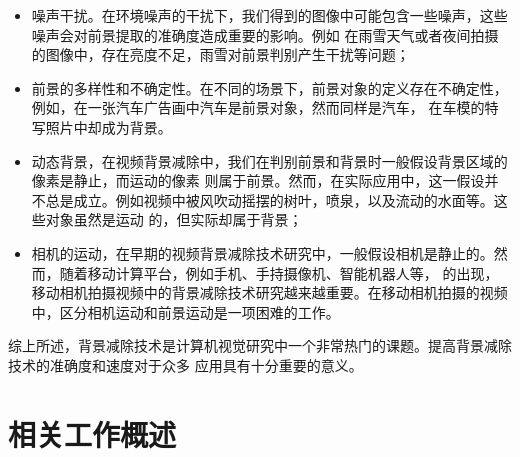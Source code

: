  \begin{itemize}
    \item 噪声干扰。在环境噪声的干扰下，我们得到的图像中可能包含一些噪声，这些噪声会对前景提取的准确度造成重要的影响。例如
    在雨雪天气或者夜间拍摄的图像中，存在亮度不足，雨雪对前景判别产生干扰等问题；
    \item 前景的多样性和不确定性。在不同的场景下，前景对象的定义存在不确定性，例如，在一张汽车广告画中汽车是前景对象，然而同样是汽车，
    在车模的特写照片中却成为背景。
    \item 动态背景，在视频背景减除中，我们在判别前景和背景时一般假设背景区域的像素是静止，而运动的像素
    则属于前景。然而，在实际应用中，这一假设并不总是成立。例如视频中被风吹动摇摆的树叶，喷泉，以及流动的水面等。这些对象虽然是运动
    的，但实际却属于背景；
    \item 相机的运动，在早期的视频背景减除技术研究中，一般假设相机是静止的。然而，随着移动计算平台，例如手机、手持摄像机、智能机器人等，
    的出现，移动相机拍摄视频中的背景减除技术研究越来越重要。在移动相机拍摄的视频中，区分相机运动和前景运动是一项困难的工作。
  \end{itemize}

\par
综上所述，背景减除技术是计算机视觉研究中一个非常热门的课题。提高背景减除技术的准确度和速度对于众多
应用具有十分重要的意义。
\section{相关工作概述}
\label{sec:second}
